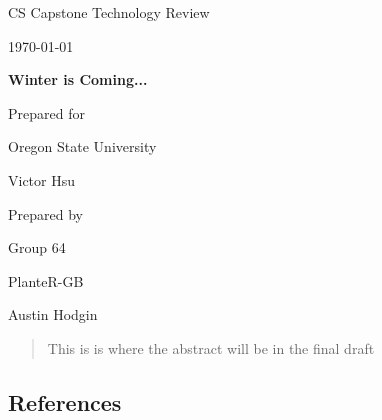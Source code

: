 \documentclass[onecolumn, draftclsnofoot,10pt, compsoc]{IEEEtran}
\def \CapstoneTeamName{			              			 PlanteR-GB}
\def \CapstoneTeamNumber{					           			 Group 64}
\def \GroupMemberOne{				           				Austin Hodgin}
\def \CapstoneProjectName{	      	    Winter is Coming...}
\def \CapstoneSponsorCompany{		    Oregon State University}
\def \CapstoneSponsorPerson{		 			  				 Victor Hsu}
\def \DocType{		%
				Technology Review
				}
\newcommand{\NameSigPair}[1]{\par
\makebox[2.75in][r]{#1} \hfil 	\makebox[3.25in]{\makebox[2.25in]{\hrulefill} \hfill		\makebox[.75in]{\hrulefill}}
\par\vspace{-12pt} \textit{\tiny\noindent
\makebox[2.75in]{} \hfil		\makebox[3.25in]{\makebox[2.25in][r]{Signature} \hfill	\makebox[.75in][r]{Date}}}}
\renewcommand{\NameSigPair}[1]{#1}
\begin{document}
\begin{titlepage}
    \begin{singlespace}
        \hfill
        \par\vspace{.2in}
        \centering
        \scshape{
            \huge CS Capstone \DocType \par
            {\large\today}\par
            \vspace{.5in}
            \textbf{\Huge\CapstoneProjectName}\par
						\vspace{1in}
            {\large Prepared for}\par
            \Huge \CapstoneSponsorCompany\par
            \vspace{5pt}
            {\Large\NameSigPair{\CapstoneSponsorPerson}\par}
						\vspace{1in}
            {\large Prepared by}\par
						{\huge \CapstoneTeamNumber}\par
            \CapstoneTeamName\par
            \vspace{5pt}
            {
							\Large
							\NameSigPair{\GroupMemberOne}\par
            }
            \vspace{20pt}
        }
				\newpage
        \begin{abstract}
					This is is where the abstract will be in the final draft
        \end{abstract}
    \end{singlespace}
\end{titlepage}
\newpage
{}
\tableofcontents
\clearpage
\singlespace
		\subsection*{References}
		\begingroup
			\renewcommand{\addcontentsline}[3]{}%
			\renewcommand{\section}[2]{}%
			
			
		\endgroup
		\newpage
		\newpage
\end{document}
